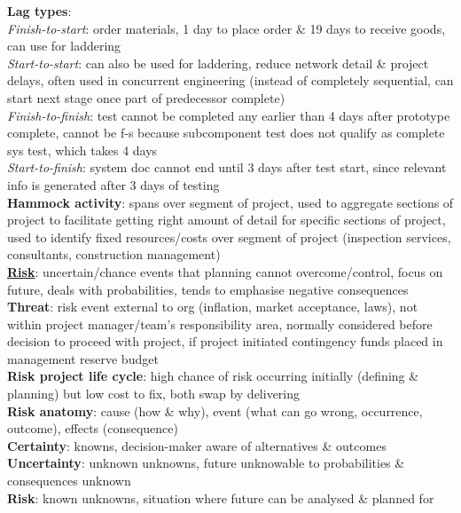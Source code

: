 \documentclass[a4paper]{article}
\begin{document}
\begin{multicols}{3}
        \textbf{Lag types}:\\
        \textit{Finish-to-start}: order materials, 1 day to place order \& 19 days to receive goods, can use for laddering\\
        \textit{Start-to-start}: can also be used for laddering, reduce network detail \& project delays, often used in concurrent engineering (instead of completely sequential, can start next stage once part of predecessor complete)\\
        \textit{Finish-to-finish}: test cannot be completed any earlier than 4 days after prototype complete, cannot be f-s because subcomponent test does not qualify as complete sys test, which takes 4 days\\
        \textit{Start-to-finish}: system doc cannot end until 3 days after test start, since relevant info is generated after 3 days of testing\\
        \textbf{Hammock activity}: spans over segment of project, used to aggregate sections of project to facilitate getting right amount of detail for specific sections of project, used to identify fixed resources/costs over segment of project (inspection services, consultants, construction management)\\
        \underline{\textbf{Risk}}: uncertain/chance events that planning cannot overcome/control, focus on future, deals with probabilities, tends to emphasise negative consequences\\
        \textbf{Threat}: risk event external to org (inflation, market acceptance, laws), not within project manager/team's responsibility area, normally considered before decision to proceed with project, if project initiated contingency funds placed in management reserve budget\\
        \textbf{Risk project life cycle}: high chance of risk occurring initially (defining \& planning) but low cost to fix, both swap by delivering\\
        \textbf{Risk anatomy}: cause (how \& why), event (what can go wrong, occurrence, outcome), effects (consequence)\\
        \textbf{Certainty}: knowns, decision-maker aware of alternatives \& outcomes\\
        \textbf{Uncertainty}: unknown unknowns, future unknowable to probabilities \& consequences unknown\\
        \textbf{Risk}: known unknowns, situation where future can be analysed \& planned for\\

\end{multicols}
\end{document}
